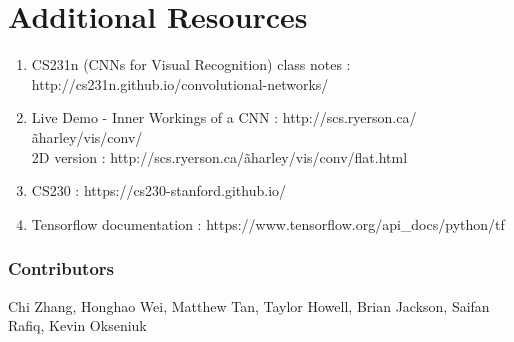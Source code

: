\documentclass[twoside]{article}
\begin{document}
\section{Additional Resources}
\begin{enumerate}
    \item CS231n (CNNs for Visual Recognition) class notes : http://cs231n.github.io/convolutional-networks/
    \item Live Demo - Inner Workings of a CNN : http://scs.ryerson.ca/\~aharley/vis/conv/ \\
 2D version : http://scs.ryerson.ca/\~aharley/vis/conv/flat.html
\item CS230 : https://cs230-stanford.github.io/
\item Tensorflow documentation : https://www.tensorflow.org/api\_docs/python/tf
\end{enumerate}





\subsubsection*{Contributors}
Chi Zhang, Honghao Wei, Matthew Tan, Taylor Howell, Brian Jackson, Saifan Rafiq, Kevin Okseniuk
\end{document}
